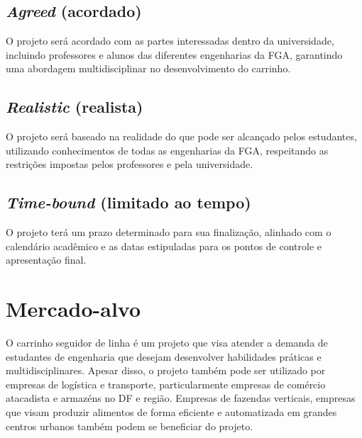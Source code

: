 \subsection{\textit{Agreed} (acordado)}

O projeto será acordado com as partes interessadas dentro da universidade,
incluindo professores e alunos das diferentes engenharias da FGA, garantindo
uma abordagem multidisciplinar no desenvolvimento do carrinho.

\subsection{\textit{Realistic} (realista)}

O projeto será baseado na realidade do que pode ser alcançado pelos estudantes,
utilizando conhecimentos de todas as engenharias da FGA, respeitando as
restrições impostas pelos professores e pela universidade.

\subsection{\textit{Time-bound} (limitado ao tempo)}

O projeto terá um prazo determinado para sua finalização, alinhado com o
calendário acadêmico e as datas estipuladas para os pontos de controle e
apresentação final.

\section{Mercado-alvo}

O carrinho seguidor de linha é um projeto que visa atender a demanda de
estudantes de engenharia que desejam desenvolver habilidades práticas e
multidisciplinares. Apesar disso, o projeto também pode ser utilizado por
empresas de logística e transporte, particularmente empresas de comércio
atacadista e armazéns no DF e região. Empresas de fazendas verticais, empresas
que visam produzir alimentos de forma eficiente e automatizada em grandes
centros urbanos também podem se beneficiar do projeto.
